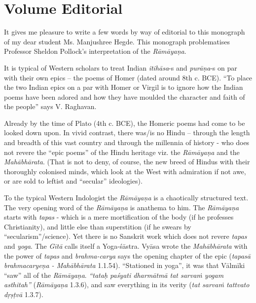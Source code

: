 \chapter*{Volume Editorial}\label{volume_editorial}


\vskip -1cm

It gives me pleasure to write a few words by way of editorial to this monograph of my dear student Ms. Manjushree Hegde. This monograph problematises Professor Sheldon Pollock's interpretation of the {\sl Rāmāyaṇa}.

It is typical of Western scholars to treat Indian {\sl itihāsa}-s and {\sl purāṇa}-s on par with their own epics -- the poems of Homer (dated around 8th c. BCE). ``To place the two Indian epics on a par with Homer or Virgil is to ignore how the Indian poems have been adored and how they have moulded the character and faith of the people'' says V. Raghavan.
 
Already by the time of Plato (4th c. BCE), the Homeric poems had come to be looked down upon. In vivid contrast, there was/is no Hindu -- through  the length and breadth of this vast country and through the millennia of history - who does not revere the ``epic poems'' of the Hindu heritage viz. the {\sl Rāmāyaṇa} and the {\sl Mahābhārata}. (That is not to deny, of course, the new breed of Hindus with their thoroughly colonised minds, which look at the West with admiration if not awe, or are sold to leftist and ``secular'' ideologies).

To the typical Western Indologist the {\sl Rāmāyaṇa} is a chaotically structured text. The very opening word of the {\sl Rāmāyaṇa} is anathema to him. The {\sl Rāmāyaṇa} starts with {\sl tapas} -  which is a mere mortification of the body (if he professes Christianity), and little else than superstition (if he swears by ``secularism''/science). Yet there is no Sanskrit work which does not revere {\sl tapas} and {\sl yoga}. The {\sl Gītā} calls itself a Yoga-śāstra. Vyāsa wrote the {\sl Mahābhārata} with the power of {\sl tapas} and {\sl brahma-carya} says the opening chapter of the epic ({\sl tapasā brahmacaryeṇa  - Mahābhārata} 1.1.54). ``Stationed in yoga'', it was that Vālmīki  ``saw'' all of the {\sl Rāmāyaṇa}. {\sl ``tataḥ paśyati dharmātmā tat sarvaṁ yogam asthitah''} ({\sl Rāmāyaṇa} 1.3.6), and saw everything in its verity ({\sl tat sarvaṁ tattvato dṛṣṭvā} 1.3.7).

